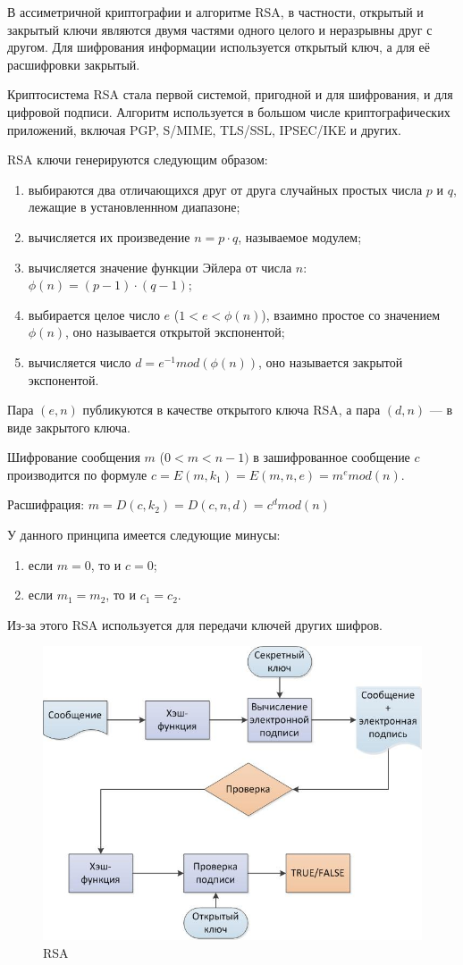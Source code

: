 В ассиметричной криптографии и алгоритме RSA, в частности, открытый и закрытый ключи являются двумя частями одного целого и неразрывны друг с другом. Для шифрования информации используется открытый ключ, а для её расшифровки закрытый.

Криптосистема RSA стала первой системой, пригодной и для шифрования, и для цифровой подписи. Алгоритм используется в большом числе криптографических приложений, включая PGP, S/MIME, TLS/SSL, IPSEC/IKE и других.

RSA ключи генерируются следующим образом:
\begin{enumerate}[label=\arabic*)]
	\item выбираются два отличающихся друг от друга случайных простых числа $p$ и $q$, лежащие в установленнном диапазоне;
	\item вычисляется их произведение $n = p \cdot q$, называемое модулем;
	\item вычисляется значение функции Эйлера от числа $n$: $\phi(n) = (p - 1)\cdot (q - 1)$;
	\item выбирается целое число $e$ ($1 < e < \phi(n)$), взаимно простое со значением $\phi(n)$, оно называется открытой экспонентой;
	\item вычисляется число $d  = e^{-1} mod (\phi(n))$, оно называется закрытой экспонентой.
\end{enumerate}

Пара $(e, n)$ публикуются в качестве открытого ключа RSA, а пара $(d, n)$ --- в виде закрытого ключа.


Шифрование сообщения $m$ ($0 < m < n - 1)$ в зашифрованное сообщение $c$ производится по формуле $ c = E(m, k_1) = E(m, n, e) = m^{e} mod (n)$.

Расшифрация: $m = D(c, k_2) = D(c, n, d) = c^{d} mod (n)$

У данного принципа имеется следующие минусы:
\begin{enumerate}[label=\arabic*)]
	\item если $m = 0$, то и $c = 0$;
	\item если $m_1 = m_2$, то и $c_1 = c_2$.
\end{enumerate}

Из-за этого RSA используется для передачи ключей других шифров.

\begin{figure}[ht!]
	\centering
	\includegraphics[width=0.8\linewidth]{img/rsa-1.jpeg}
	\caption{RSA}
	\label{img:g_function}
\end{figure}

